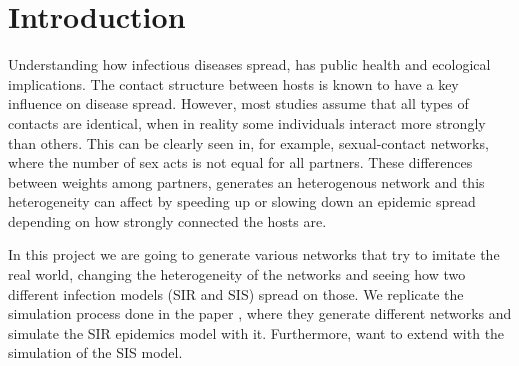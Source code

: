 \section{Introduction}
\label{sec:intro}
Understanding how infectious diseases spread, has public health and ecological implications. The contact structure between hosts is known to have a key influence on disease spread. However, most studies assume that all types of contacts are identical, when in reality some individuals interact more strongly than others. This can be clearly seen in, for example, sexual-contact networks, where the number of sex acts is not equal for all partners. These differences between weights among partners, generates an heterogenous network and this heterogeneity can affect by speeding up or slowing down an epidemic spread depending on how strongly connected the hosts are.

In this project we are going to generate various networks that try to imitate the real world, changing the heterogeneity of the networks and seeing how two different infection models (SIR and SIS) spread on those. We replicate the simulation process done in the paper \cite{10.1371/journal.pcbi.1003352}, where they generate different networks and simulate the SIR epidemics model with it. Furthermore, want to extend with the simulation of the SIS model.